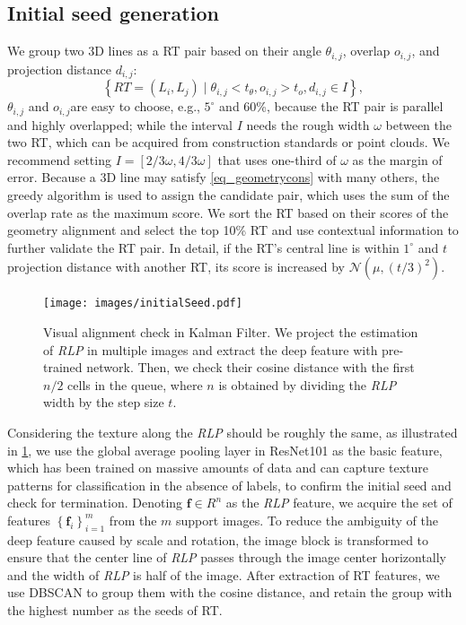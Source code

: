 \subsection{Initial seed generation}

We group two 3D lines as a RT pair based on their angle $\theta_{i,j}$,
overlap $o_{i,j}$,
and projection distance $d_{i,j}$:
\begin{equation}
   \left\{ RT= \left(L_i, L_j\right) \mid \theta_{i,j} < t_\theta, o_{i,j} > t_o, d_{i,j} \in I  \right\},
    \label{eq_geometrycons}
\end{equation}
$\theta_{i,j}$ and $o_{i,j}$are easy to choose,
e.g.,
$5^\circ$ and 60\%,
because the RT pair is parallel and highly overlapped;
while the interval $I$ needs the rough width $\omega$ between the two RT,
which can be acquired from construction standards or point clouds.
We recommend setting $I=\left[2/3\omega,4/3\omega\right]$ that uses one-third of $\omega$ as the margin of error.
Because a 3D line may satisfy \cref{eq_geometrycons} with many others,
the greedy algorithm is used to assign the candidate pair,
which uses the sum of the overlap rate as the maximum score.
We sort the RT based on their scores of the geometry alignment and select the top 10\% RT and use contextual information to further validate the RT pair.
In detail,
if the RT's central line is within $1^\circ$ and $t$ projection distance with another RT,
its score is increased by $\mathcal{N}\left(\mu, \left(t/3\right)^2\right)$.

\begin{figure}[h]
    \centering
    \texttt{[image: images/initialSeed.pdf]}
    \caption{Visual alignment check in Kalman Filter.
    We project the estimation of \textit{RLP} in multiple images and extract the deep feature with pre-trained network.
    Then, 
    we check their cosine distance with the first $n/2$ cells in the queue,
    where $n$ is obtained by dividing the \textit{RLP} width by the step size $t$.}
    \label{fig_visualCheck}
\end{figure}

Considering the texture along the \textit{RLP} should be roughly the same, 
as illustrated in \cref{fig_visualCheck},
we use the global average pooling layer in ResNet101 as the basic feature,
which has been trained on massive amounts of data and can capture texture patterns for classification in the absence of labels,
to confirm the initial seed and check for termination.
Denoting $\mathbf f \in R^n$ as the \textit{RLP} feature,
we acquire the set of features $\left\{\mathbf f_i\right\}_{i=1}^m$ from the $m$ support images.
To reduce the ambiguity of the deep feature caused by scale and rotation,
the image block is transformed to ensure that the center line of \textit{RLP} passes through the image center horizontally and the width of \textit{RLP} is half of the image.
After extraction of RT features, 
we use DBSCAN to group them with the cosine distance,
and retain the group with the highest number as the seeds of RT.



